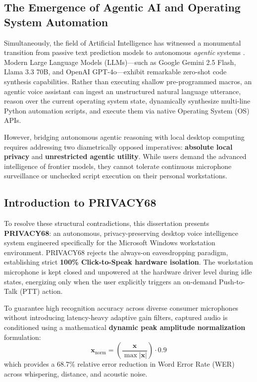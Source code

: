 \subsection{The Emergence of Agentic AI and Operating System Automation}
Simultaneously, the field of Artificial Intelligence has witnessed a monumental transition from passive text prediction models to autonomous \textit{agentic} systems \cite{wang2023survey, yao2023react}. Modern Large Language Models (LLMs)---such as Google Gemini 2.5 Flash, Llama 3.3 70B, and OpenAI GPT-4o---exhibit remarkable zero-shot code synthesis capabilities. Rather than executing shallow pre-programmed macros, an agentic voice assistant can ingest an unstructured natural language utterance, reason over the current operating system state, dynamically synthesize multi-line Python automation scripts, and execute them via native Operating System (OS) APIs.

However, bridging autonomous agentic reasoning with local desktop computing requires addressing two diametrically opposed imperatives: \textbf{absolute local privacy} and \textbf{unrestricted agentic utility}. While users demand the advanced intelligence of frontier models, they cannot tolerate continuous microphone surveillance or unchecked script execution on their personal workstations.

\subsection{Introduction to PRIVACY68}
To resolve these structural contradictions, this dissertation presents \textbf{PRIVACY68}: an autonomous, privacy-preserving desktop voice intelligence system engineered specifically for the Microsoft Windows workstation environment. PRIVACY68 rejects the always-on eavesdropping paradigm, establishing strict \textbf{100\% Click-to-Speak hardware isolation}. The workstation microphone is kept closed and unpowered at the hardware driver level during idle states, energizing only when the user explicitly triggers an on-demand Push-to-Talk (PTT) action.

To guarantee high recognition accuracy across diverse consumer microphones without introducing latency-heavy adaptive gain filters, captured audio is conditioned using a mathematical \textbf{dynamic peak amplitude normalization} formulation:
\begin{equation}
    \mathbf{x}_{\text{norm}} = \left(\frac{\mathbf{x}}{\max |\mathbf{x}|}\right) \cdot 0.9
\end{equation}
which provides a 68.7\% relative error reduction in Word Error Rate (WER) across whispering, distance, and acoustic noise. 

